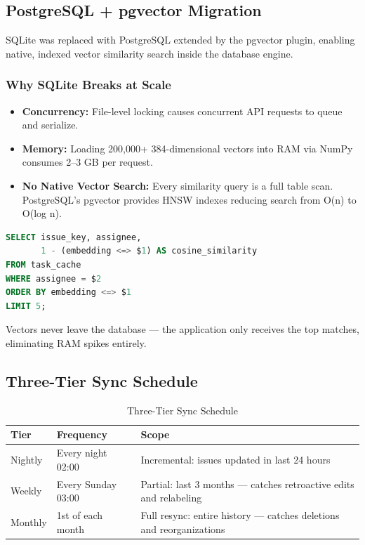 \documentclass[12pt, a4paper]{article}
\begin{document}
\subsection{PostgreSQL + pgvector Migration}

SQLite was replaced with PostgreSQL extended by the pgvector plugin, enabling native, indexed vector similarity search inside the database engine.

\subsubsection{Why SQLite Breaks at Scale}

\begin{itemize}
    \item \textbf{Concurrency:} File-level locking causes concurrent API requests to queue and serialize.
    \item \textbf{Memory:} Loading 200{,}000+ 384-dimensional vectors into RAM via NumPy consumes 2--3 GB per request.
    \item \textbf{No Native Vector Search:} Every similarity query is a full table scan. PostgreSQL's pgvector provides HNSW indexes reducing search from O(n) to O(log n).
\end{itemize}

\begin{lstlisting}[language=SQL, caption={pgvector similarity query}]
SELECT issue_key, assignee,
       1 - (embedding <=> $1) AS cosine_similarity
FROM task_cache
WHERE assignee = $2
ORDER BY embedding <=> $1
LIMIT 5;
\end{lstlisting}

Vectors never leave the database — the application only receives the top matches, eliminating RAM spikes entirely.


\subsection{Three-Tier Sync Schedule}

\begin{table}[H]
\centering
\caption{Three-Tier Sync Schedule}
\begin{tabularx}{\textwidth}{|l|l|X|}
\hline
\textbf{Tier} & \textbf{Frequency} & \textbf{Scope} \\
\hline
Nightly & Every night 02:00   & Incremental: issues updated in last 24 hours \\
Weekly  & Every Sunday 03:00  & Partial: last 3 months — catches retroactive edits and relabeling \\
Monthly & 1st of each month   & Full resync: entire history — catches deletions and reorganizations \\
\hline
\end{tabularx}
\end{table}
\end{document}
